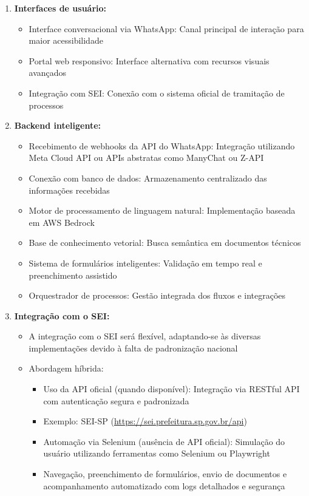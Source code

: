 \documentclass[12pt,a4paper]{article}
\begin{document}
\begin{enumerate}
    \item \textbf{Interfaces de usuário:}
    \begin{itemize}
        \item Interface conversacional via WhatsApp: Canal principal de interação para maior acessibilidade
        \item Portal web responsivo: Interface alternativa com recursos visuais avançados
        \item Integração com SEI: Conexão com o sistema oficial de tramitação de processos
    \end{itemize}
    
    \item \textbf{Backend inteligente:}
    \begin{itemize}
        \item Recebimento de webhooks da API do WhatsApp: Integração utilizando Meta Cloud API ou APIs abstratas como ManyChat ou Z-API
        \item Conexão com banco de dados: Armazenamento centralizado das informações recebidas
        \item Motor de processamento de linguagem natural: Implementação baseada em AWS Bedrock
        \item Base de conhecimento vetorial: Busca semântica em documentos técnicos
        \item Sistema de formulários inteligentes: Validação em tempo real e preenchimento assistido
        \item Orquestrador de processos: Gestão integrada dos fluxos e integrações
    \end{itemize}
    
    \item \textbf{Integração com o SEI:}
    \begin{itemize}
        \item A integração com o SEI será flexível, adaptando-se às diversas implementações devido à falta de padronização nacional
        \item Abordagem híbrida:
        \begin{itemize}
            \item Uso da API oficial (quando disponível): Integração via RESTful API com autenticação segura e padronizada
            \item Exemplo: SEI-SP (\url{https://sei.prefeitura.sp.gov.br/api})
            \item Automação via Selenium (ausência de API oficial): Simulação do usuário utilizando ferramentas como Selenium ou Playwright
            \item Navegação, preenchimento de formulários, envio de documentos e acompanhamento automatizado com logs detalhados e segurança
        \end{itemize}
    \end{itemize}
    

\end{enumerate}
\end{document}
